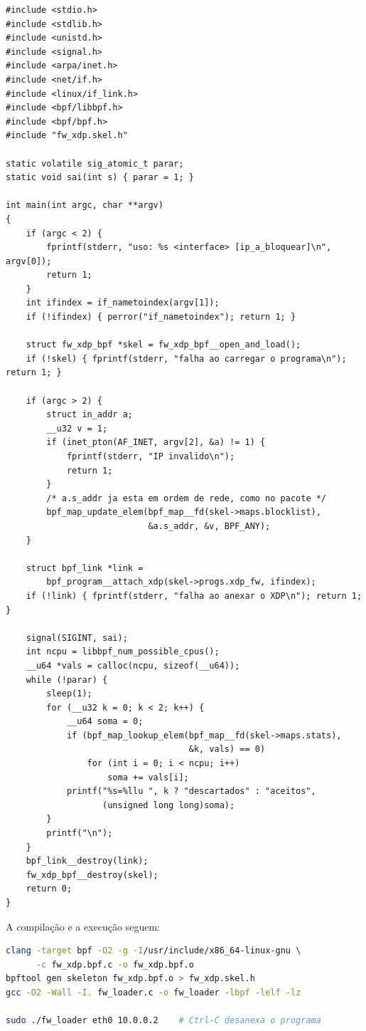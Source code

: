 \begin{lstlisting}[caption={Carregador libbpf para o firewall XDP (fw\_loader.c).}, label=lst:ferr-libbpf-loader]
#include <stdio.h>
#include <stdlib.h>
#include <unistd.h>
#include <signal.h>
#include <arpa/inet.h>
#include <net/if.h>
#include <linux/if_link.h>
#include <bpf/libbpf.h>
#include <bpf/bpf.h>
#include "fw_xdp.skel.h"

static volatile sig_atomic_t parar;
static void sai(int s) { parar = 1; }

int main(int argc, char **argv)
{
    if (argc < 2) {
        fprintf(stderr, "uso: %s <interface> [ip_a_bloquear]\n", argv[0]);
        return 1;
    }
    int ifindex = if_nametoindex(argv[1]);
    if (!ifindex) { perror("if_nametoindex"); return 1; }

    struct fw_xdp_bpf *skel = fw_xdp_bpf__open_and_load();
    if (!skel) { fprintf(stderr, "falha ao carregar o programa\n"); return 1; }

    if (argc > 2) {
        struct in_addr a;
        __u32 v = 1;
        if (inet_pton(AF_INET, argv[2], &a) != 1) {
            fprintf(stderr, "IP invalido\n");
            return 1;
        }
        /* a.s_addr ja esta em ordem de rede, como no pacote */
        bpf_map_update_elem(bpf_map__fd(skel->maps.blocklist),
                            &a.s_addr, &v, BPF_ANY);
    }

    struct bpf_link *link =
        bpf_program__attach_xdp(skel->progs.xdp_fw, ifindex);
    if (!link) { fprintf(stderr, "falha ao anexar o XDP\n"); return 1; }

    signal(SIGINT, sai);
    int ncpu = libbpf_num_possible_cpus();
    __u64 *vals = calloc(ncpu, sizeof(__u64));
    while (!parar) {
        sleep(1);
        for (__u32 k = 0; k < 2; k++) {
            __u64 soma = 0;
            if (bpf_map_lookup_elem(bpf_map__fd(skel->maps.stats),
                                    &k, vals) == 0)
                for (int i = 0; i < ncpu; i++)
                    soma += vals[i];
            printf("%s=%llu ", k ? "descartados" : "aceitos",
                   (unsigned long long)soma);
        }
        printf("\n");
    }
    bpf_link__destroy(link);
    fw_xdp_bpf__destroy(skel);
    return 0;
}
\end{lstlisting}

A compilação e a execução seguem:

\begin{lstlisting}[language=bash, caption={Compilação e execução do carregador.}, label=lst:ferr-libbpf-build]
clang -target bpf -O2 -g -I/usr/include/x86_64-linux-gnu \
      -c fw_xdp.bpf.c -o fw_xdp.bpf.o
bpftool gen skeleton fw_xdp.bpf.o > fw_xdp.skel.h
gcc -O2 -Wall -I. fw_loader.c -o fw_loader -lbpf -lelf -lz

sudo ./fw_loader eth0 10.0.0.2    # Ctrl-C desanexa o programa
\end{lstlisting}

